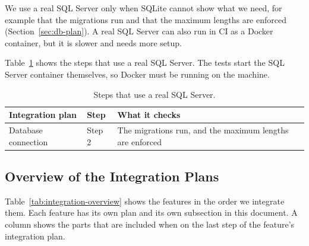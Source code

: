 \documentclass[a4paper,11pt]{article}
\begin{document}
We use a real SQL Server only when SQLite cannot show what we need, for example that the migrations run and that the maximum lengths are enforced (Section~\ref{sec:db-plan}). A real SQL Server can also run in CI as a Docker container, but it is slower and needs more setup.

Table~\ref{tab:sql-server-tests} shows the steps that use a real SQL Server. The tests start the SQL Server container themselves, so Docker must be running on the machine.

\begin{table}[H]
\centering
\small
{}
\begin{tabular}{@{}l l p{6.5cm}@{}}
\textbf{Integration plan} & \textbf{Step} & \textbf{What it checks} \\
\hline
Database connection & Step 2 & The migrations run, and the maximum lengths are enforced \\
\end{tabular}
\caption{Steps that use a real SQL Server.}
\label{tab:sql-server-tests}
\end{table}

\subsection{Overview of the Integration Plans}
Table~\ref{tab:integration-overview} shows the features in the order we integrate them. Each feature has its own plan and its own subsection in this document. A column shows the parts that are included when on the last step of the feature's integration plan.
\end{document}
